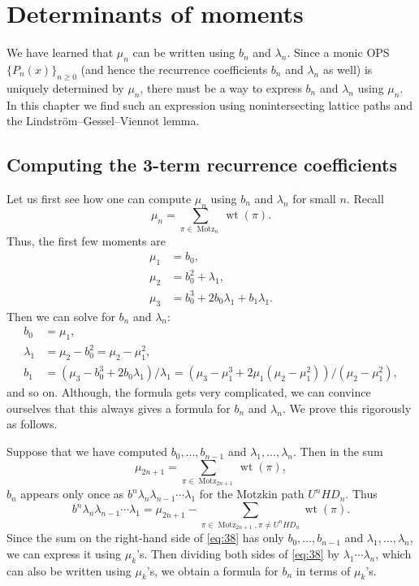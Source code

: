 \documentclass[oneside]{book}
\numberwithin{equation}{section}
\theoremstyle{definition}
\newcommand\Motz{\operatorname{Motz}}
\newcommand\wt{\operatorname{wt}}
\begin{document}
\chapter{Determinants of moments}

We have learned that \( \mu_n \) can be written using \( b_n \) and
\( \lambda_n \). Since a monic OPS \( \{ P_n(x) \}_{n\ge 0} \) (and
hence the recurrence coefficients \( b_n \) and \( \lambda_n \) as
well) is uniquely determined by \( \mu_n \), there must be a way to
express \( b_n \) and \( \lambda_n \) using \( \mu_n \). In this
chapter we find such an expression using nonintersecting lattice paths
and the Lindstr\"om--Gessel--Viennot lemma.

\section{Computing the 3-term recurrence coefficients}

Let us first see how one can compute \( \mu_n \) using \( b_n \) and
\( \lambda_n \) for small \( n \). Recall
\[
  \mu_n = \sum_{\pi\in \Motz_n} \wt(\pi).
\]
Thus, the first few moments are
\begin{align*}
  \mu_1 &= b_0,\\
  \mu_2 &= b_0^2 + \lambda_1,\\
  \mu_3 &= b_0^3 + 2b_0\lambda_1 + b_1\lambda_1.
\end{align*}
Then we can solve for \( b_n \) and \( \lambda_n \):
\begin{align*}
  b_0  &= \mu_1, \\
  \lambda_1 &=  \mu_2 - b_0^2 = \mu_2 - \mu_1^2, \\
  b_1 &=  (\mu_3 -b_0^3 + 2b_0\lambda_1)/\lambda_1
        = (\mu_3 -\mu_1^3 + 2\mu_1(\mu_2-\mu_1^2))/(\mu_2 - \mu_1^2),
\end{align*}
and so on. Although, the formula gets very complicated, we can
convince ourselves that this always gives a formula for \( b_n \) and
\( \lambda_n \). We prove this rigorously as follows.

Suppose that we have computed \( b_0,\dots,b_{n-1} \) and
\( \lambda_1,\dots,\lambda_n \). Then in the sum
\[
  \mu_{2n+1} = \sum_{\pi\in \Motz_{2n+1}} \wt(\pi),
\]
\( b_n \) appears only once as \( b^n \lambda_n \lambda_{n-1} \cdots \lambda_1 \)
for the Motzkin path \( U^n H D_n \). Thus
\begin{equation}\label{eq:38}
  b^n \lambda_n \lambda_{n-1} \cdots \lambda_1
  = \mu_{2n+1} - \sum_{\pi\in \Motz_{2n+1}, \pi\ne U^n H D_n} \wt(\pi).
\end{equation}
Since the sum on the right-hand side of \eqref{eq:38} has only
\( b_0,\dots,b_{n-1} \) and \( \lambda_1,\dots,\lambda_n \), we can
express it using \( \mu_k \)'s. Then dividing both sides of
\eqref{eq:38} by \( \lambda_1 \cdots \lambda_n \), which can also be
written using \( \mu_k \)'s, we obtain a formula for \( b_n \) in
terms of \( \mu_k \)'s.
\end{document}
